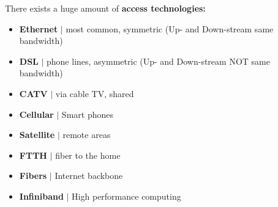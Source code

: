 \documentclass[a4paper, fontsize=8pt, landscape, DIV=1]{scrartcl}
\begin{document}
\begin{multicols*}{4}
				There exists a huge amount of \textbf{access technologies: }
				\begin{itemize}[noitemsep]
					\item \textbf{Ethernet} $\vert$ most common, symmetric (Up- and Down-stream same bandwidth)
					\item \textbf{DSL} $\vert$ phone lines, asymmetric (Up- and Down-stream NOT same bandwidth)
					\item \textbf{CATV} $\vert$ via cable TV, shared
					\item \textbf{Cellular} $\vert$ Smart phones 
					\item \textbf{Satellite} $\vert$ remote areas
					\item \textbf{FTTH} $\vert$ fiber to the home
					\item \textbf{Fibers} $\vert$ Internet backbone 
					\item \textbf{Infiniband} $\vert$ High performance computing 
				\end{itemize}

\end{multicols*}
\end{document}
